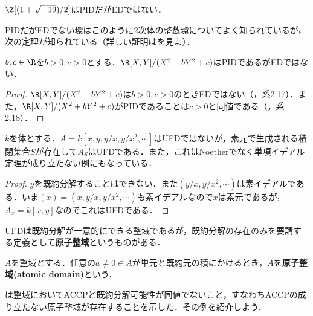 \begin{surex}[PIDだがEDでない環]
	$\Z[(1+\sqrt{-19})/2]$はPIDだがEDではない．
\end{surex}

PIDだがEDでない環はこのように2次体の整数環についてよく知られているが，次の定理が知られている（詳しい証明は\cite{Goel2018}を見よ）．

\begin{thm}
	$b,c\in\R$を$b>0,c>0$とする．$\R[X,Y]/(X^2+bY^2+c)$はPIDであるがEDではない．
\end{thm}

\begin{proof}
	$\R[X,Y]/(X^2+bY^2+c)$は$b>0,c>0$のときEDではない（\cite{Goel2018}，系2.17）．また，$\R[X,Y]/(X^2+bY^2+c)$がPIDであることは$c>0$と同値である（\cite{Goel2018}，系2.18）．
\end{proof}

\begin{surex}\label{ex:UFD永田の反例}
	$k$を体とする．$A=k[x,y,y/x,y/x^2,\cdots]$はUFDではないが，素元で生成される積閉集合$S$が存在して$A_S$はUFDである．また，これはNoetherでなく単項イデアル定理が成り立たない例にもなっている．
\end{surex}

\begin{proof}
	$y$を既約分解することはできない．また$(y/x,y/x^2,\cdots)$は素イデアルである．いま$(x)=(x,y/x,y/x^2,\cdots)$も素イデアルなので$x$は素元であるが，$A_x=k[x,y]$なのでこれはUFDである．
\end{proof}

UFDは既約分解が一意的にできる整域であるが，既約分解の存在のみを要請する定義として\textbf{原子整域}というものがある．

\begin{defi}[原子整域]
	$A$を整域とする．任意の$a\neq 0\in A$が単元と既約元の積にかけるとき，$A$を\textbf{原子整域(atomic domain)}という．
\end{defi}

\cite{Grams1974}は整域においてACCPと既約分解可能性が同値でないこと，すなわちACCPの成り立たない原子整域が存在することを示した．その例を紹介しよう．%

